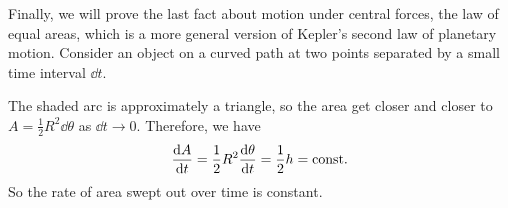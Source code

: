 \documentclass[../classical_mechanics.tex]{subfiles}
\begin{document}
        Finally, we will prove the last fact about motion under central forces, the law of equal areas, which is a more general version of Kepler's second law of planetary motion.
        Consider an object on a curved path at two points separated by a small time interval $\dd{t}$.
        \begin{figure}[H]
            \centering
        \end{figure}
        The shaded arc is approximately a triangle, so the area get closer and closer to $A=\frac{1}{2}R^2\dd{\theta}$ as $\dd{t}\to0$.
        Therefore, we have
        \begin{equation}
            \dv{A}{t}=\frac{1}{2}R^2\dv{\theta}{t}=\frac{1}{2}h=\text{const}.
        \end{equation}
        So the rate of area swept out over time is constant.
\end{document}
